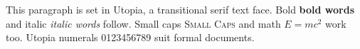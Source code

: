 \documentclass{article}
\begin{document}
This paragraph is set in Utopia, a transitional serif text face.
Bold \textbf{bold words} and italic \textit{italic words} follow.
Small caps \textsc{Small Caps} and math $E = mc^2$ work too.
Utopia numerals 0123456789 suit formal documents.
\end{document}
